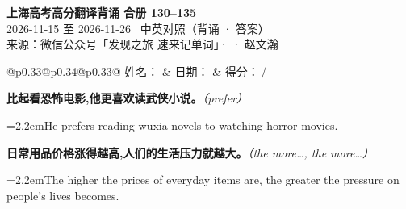 \documentclass[11pt,a4paper]{article}
\newcommand{\num}[1]{\makebox[1.9em][r]{#1.}\hspace{0.3em}}
\newcommand{\prompt}[1]{\emph{\textcolor{tipblue}{\small（#1）}}}
\begin{document}
\pagestyle{plain}
\begin{center}
{\LARGE\bfseries 上海高考高分翻译背诵 \quad 合册 130–135}\\[0.25em]
{\large 2026-11-15 至 2026-11-26 \quad\ 中英对照（背诵 · 答案）}\\[0.35em]
{\footnotesize 来源：微信公众号「发现之旅 速来记单词」·  · 赵文瀚}
\end{center}

\vspace{0.4em}
\noindent\begin{tabular}{@{}p{0.33\textwidth}@{}p{0.34\textwidth}@{}p{0.33\textwidth}@{}}
姓名：\underline{\hspace{2.0cm}} & 日期：\underline{\hspace{2.0cm}} & 得分：\underline{\hspace{1.4cm}}\,/ \\
\end{tabular}

\vspace{0.5em}

\vspace{0.8em}
\vspace{0.35em}\vspace{0.15em}

\begin{minipage}{\linewidth}

\num{1}\textbf{比起看恐怖电影,他更喜欢读武侠小说。}\prompt{prefer}

\vspace{0.15em}

\noindent\hangindent=2.2em\hspace{2.2em}He prefers reading wuxia novels to watching horror movies.

\end{minipage}

\begin{minipage}{\linewidth}

\num{2}\textbf{日常用品价格涨得越高,人们的生活压力就越大。}\prompt{the more…, the more…}

\vspace{0.15em}

\noindent\hangindent=2.2em\hspace{2.2em}The higher the prices of everyday items are, the greater the pressure on people’s lives becomes.

\end{minipage}
\end{document}
